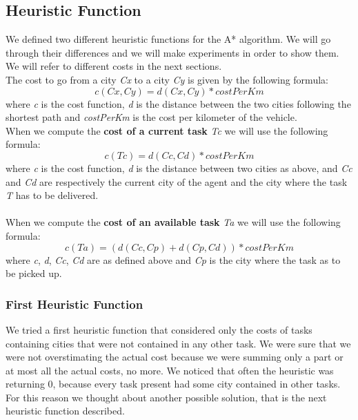 \documentclass[11pt]{article}
\begin{document}
\subsection{Heuristic Function}
We defined two different heuristic functions for the A* algorithm. We will go through their differences and we will make experiments in order to show them.
\\
We will refer to different costs in the next sections.\\
The cost to go from a city \textit{Cx} to a city \textit{Cy} is given by the following formula:
\begin{equation}
c(Cx, Cy) = d(Cx, Cy) * costPerKm
\end{equation}where \textit{c} is the cost function, \textit{d} is the distance between the two cities following the shortest path and \textit{costPerKm} is the cost per kilometer of the vehicle.\\
When we compute the \textbf{cost of a current task} \textit{Tc} we will use the following formula:
\begin{equation}
c(Tc) = d(Cc, Cd) * costPerKm
\end{equation}where \textit{c} is the cost function, \textit{d} is the distance between two cities as above, and \textit{Cc} and \textit{Cd} are respectively the current city of the agent and the city where the task \textit{T} has to be delivered.\\
\\
When we compute the \textbf{cost of an available task} \textit{Ta} we will use the following formula:
\begin{equation}
c(Ta) = (d(Cc, Cp) + d(Cp, Cd)) * costPerKm
\end{equation}where \textit{c}, \textit{d}, \textit{Cc}, \textit{Cd} are as defined above and \textit{Cp} is the city where the task as to be picked up.

\subsubsection{First Heuristic Function}

We tried a first heuristic function that considered only the costs of tasks containing cities that were not contained in any other task. We were sure that we were not overstimating the actual cost because we were summing only a part or at most all the actual costs, no more. We noticed that often the heuristic was returning 0, because every task present had some city contained in other tasks. For this reason we thought about another possible solution, that is the next heuristic function described.
\end{document}
